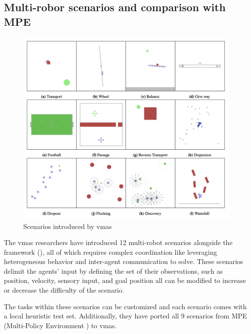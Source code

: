 \documentclass[12pt,a4paper,openright,twoside]{book}
\begin{document}
\subsection{Multi-robor scenarios and comparison with MPE}
\begin{figure}[t]
    \centering
    \includegraphics[width=\textwidth]{img/vmasscenarios.png}
    \caption{Scenarios introduced by \ac{vmas}}
    \label{fig:u}
\end{figure}
The \ac{vmas} researchers have introduced 12 multi-robot scenarios alongside the framework (), all of which requires complex coordination like leveraging heterogeneous behavior and inter-agent communication to solve. These scenarios delimit the agents' input by defining the set of their observations, such as position, velocity, sensory input, and goal position all can be modified to increase or decrease the difficulty of the scenario.

The tasks within these scenarios can be customized and each scenario comes with a local heuristic test set. Additionally, they have ported all 9 scenarios from MPE (Multi-Policy Environment \cite{lowe2020multiagent}) to \ac{vmas}.
\end{document}
